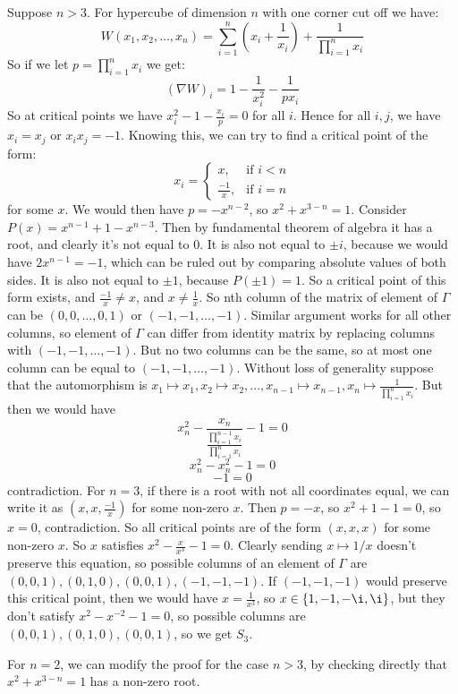 \documentclass[a4paper]{article}
\begin{document}
Suppose $n>3$.
For hypercube of dimension $n$ with one corner cut off we have:
$$W(x_1,x_2, \dots, x_n) = \sum_{i=1}^{n}(x_i+\frac{1}{x_i}) + \frac{1}{\prod_{i=1}^{n}x_i}$$
So if we let $p = \prod_{i=1}^{n}x_i$ we get:
$$(\nabla W)_i = 1-\frac{1}{x_i^2}-\frac{1}{p x_i}$$
So at critical points we have $x_i^2-1-\frac{x_i}{p} = 0$ for all $i$. Hence for all $i,j$, we have $x_i = x_j$ or $x_i x_j = -1$.
Knowing this, we can try to find a critical point of the form:
\[x_i = \begin{cases}
x,& \text{if } i < n\\
\frac{-1}{x},   & \text{if } i = n
\end{cases}
\]
for some $x$. We would then have $p = -x^{n-2}$, so $x^2 +x^{3-n} = 1$.
Consider $P(x) = x^{n-1}+1-x^{n-3}$.
Then by fundamental theorem of algebra it has a root, and clearly it's not equal to $0$. It is also not equal to $\pm i$, because we would have $2 x^{n-1} = -1$, which can be ruled out by comparing absolute values of both sides. It is also not equal to $\pm 1$, because $P(\pm 1) =1$. So a critical point of this form exists, and $\frac{-1}{x} \neq x$, and $x \neq \frac{1}{x}$.
So nth column of the matrix of element of $\Gamma$ can be $(0,0,\dots,0,1)$ or $(-1,-1,\dots,-1)$.
Similar argument works for all other columns, so element of $\Gamma$ can differ from identity matrix by replacing columns with $(-1,-1,\dots,-1)$. 
But no two columns can be the same, so at most one column can be equal to $(-1,-1,\dots,-1)$.
Without loss of generality suppose that the automorphism is $x_1 \mapsto x_1, x_2 \mapsto x_2, ..., x_{n-1} \mapsto x_{n-1}, x_{n} \mapsto \frac{1}{\prod_{i=1}^{n}x_i}$.
But then we would have $$x_n^2 -\frac{x_n}{ \frac{\prod_{i=1}^{n-1}x_i}{\prod_{i=1}^{n}x_i}}-1=0$$
$$x_n^2-x_n^2-1=0$$
$$-1=0$$
contradiction.
For $n=3$, if there is a root with not all coordinates equal, we can write it as $(x, x, \frac{-1}{x})$ for some non-zero $x$. Then $p=-x$, so $x^2+1-1=0$, so $x=0$, contradiction.
So all critical points are of the form $(x, x, x)$ for some non-zero $x$.
So $x$ satisfies $x^2 - \frac{x}{x^3} - 1 =0$.
Clearly sending $x \mapsto 1/x$ doesn't preserve this equation, so possible columns of an element of $\Gamma$ are $(0,0,1), (0,1,0), (0,0,1), (-1,-1,-1)$. If $(-1,-1, -1)$ would preserve this critical point, then we would have $x=\frac{1}{x^3}$, so $x \in \{1,-1,-\i,\i\}$, but they don't satisfy $x^2 - x^{-2} - 1 =0$, so possible columns are $(0,0,1), (0,1,0), (0,0,1)$, so we get $S_3$.

For $n=2$, we can modify the proof for the case $n>3$, by checking directly that $x^2 +x^{3-n} = 1$ has a non-zero root.
\end{document}
